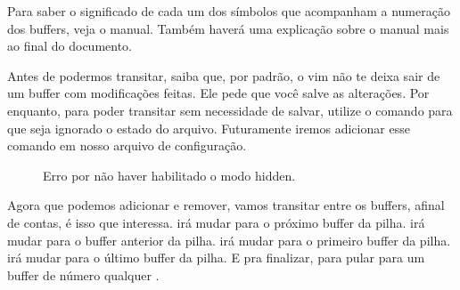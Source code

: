 Para saber o significado de cada um dos símbolos que acompanham a numeração dos buffers, veja o manual.
Também haverá uma explicação sobre o manual mais ao final do documento.

Antes de podermos transitar, saiba que, por padrão, o vim não te deixa sair de um buffer com modificações feitas.
Ele pede que você salve as alterações.
Por enquanto, para poder transitar sem necessidade de salvar, utilize o comando  para
que seja ignorado o estado do arquivo.
Futuramente iremos adicionar esse comando em nosso arquivo de configuração.
\begin{figure}
\begin{center}
\caption{Erro por não haver habilitado o modo hidden.}
\end{center}
\end{figure}

Agora que podemos adicionar e remover, vamos transitar entre os buffers, afinal de contas, é isso que interessa.
 irá mudar para o próximo buffer da pilha.
 irá mudar para o buffer anterior da pilha.
 irá mudar para o primeiro buffer da pilha.
 irá mudar para o último buffer da pilha.
E pra finalizar, para pular para um buffer de número qualquer .

